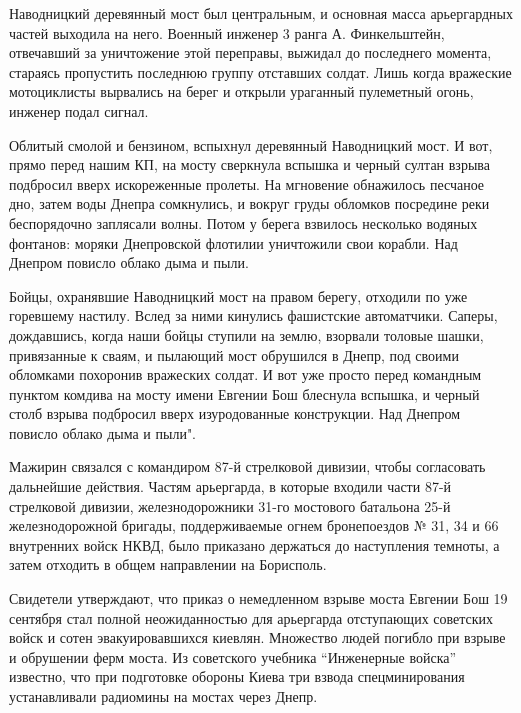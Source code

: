 
Наводницкий деревянный мост был центральным, и основная масса арьергардных
частей выходила на него. Военный инженер 3 ранга А. Финкельштейн, отвечавший за
уничтожение этой переправы, выжидал до последнего момента, стараясь пропустить
последнюю группу отставших солдат. Лишь когда вражеские мотоциклисты вырвались
на берег и открыли ураганный пулеметный огонь, инженер подал сигнал.


Облитый смолой и бензином, вспыхнул деревянный Наводницкий мост. И вот, прямо
перед нашим КП, на мосту сверкнула вспышка и черный султан взрыва подбросил
вверх искореженные  пролеты. На мгновение обнажилось песчаное дно, затем воды
Днепра сомкнулись, и вокруг  груды обломков посредине реки беспорядочно
заплясали волны. Потом у берега взвилось несколько водяных фонтанов: моряки
Днепровской флотилии уничтожили свои корабли. Над Днепром повисло облако дыма и
пыли.


Бойцы, охранявшие Наводницкий мост на правом берегу, отходили по уже горевшему
настилу. Вслед за ними кинулись фашистские автоматчики. Саперы, дождавшись,
когда наши бойцы ступили на землю, взорвали толовые шашки, привязанные к сваям,
и пылающий мост обрушился в Днепр, под своими обломками похоронив вражеских
солдат. И вот уже просто перед командным пунктом комдива на мосту имени Евгении
Бош блеснула вспышка, и черный столб взрыва подбросил вверх изуродованные
конструкции. Над Днепром повисло облако дыма и пыли".


Мажирин связался с командиром 87-й стрелковой дивизии, чтобы согласовать
дальнейшие действия. Частям арьергарда, в которые входили части 87-й стрелковой
дивизии,  железнодорожники 31-го мостового батальона 25-й железнодорожной
бригады, поддерживаемые огнем бронепоездов № 31, 34 и 66 внутренних войск НКВД,
было приказано держаться до наступления темноты, а затем отходить в общем
направлении на Борисполь.

Свидетели утверждают, что приказ о немедленном взрыве моста Евгении Бош 19
сентября стал полной неожиданностью для арьергарда отступающих советских войск
и сотен эвакуировавшихся киевлян. Множество людей погибло при взрыве и
обрушении ферм моста. Из советского учебника \enquote{Инженерные войска} известно, что
при подготовке обороны Киева три взвода спецминирования устанавливали радиомины
на мостах через Днепр.

